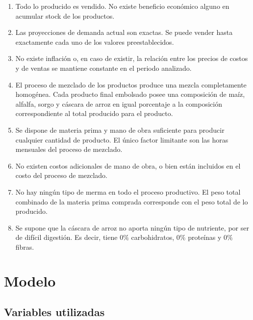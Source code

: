 \documentclass[a4paper,11pt]{article}
\begin{document}
\begin{enumerate}

  \item Todo lo producido es vendido. No existe beneficio económico alguno en
    acumular stock de los productos.

  \item Las proyecciones de demanda actual son exactas. Se puede vender hasta
    exactamente cada uno de los valores preestablecidos.

  \item No existe inflación o, en caso de existir, la relación entre los
    precios de costos y de ventas se mantiene constante en el periodo
    analizado.

  \item El proceso de mezclado de los productos produce una mezcla
    completamente homogénea. Cada producto final embolsado posee una
    composición de maíz, alfalfa, sorgo y cáscara de arroz en igual porcentaje
    a la composición correspondiente al total producido para el producto.

  \item Se dispone de materia prima y mano de obra suficiente para producir
    cualquier cantidad de producto. El único factor limitante son las horas
    mensuales del proceso de mezclado.

  \item No existen costos adicionales de mano de obra, o bien están incluidos
    en el costo del proceso de mezclado.

  \item No hay ningún tipo de merma en todo el proceso productivo. El peso
    total combinado de la materia prima comprada corresponde con el peso total
    de lo producido.

  \item Se supone que la cáscara de arroz no aporta ningún tipo de nutriente,
    por ser de difícil digestión. Es decir, tiene \(0\%\) carbohidratos,
    \(0\%\) proteínas y \(0\%\) fibras.

\end{enumerate}

\section{Modelo}

\subsection{Variables utilizadas}
\end{document}

